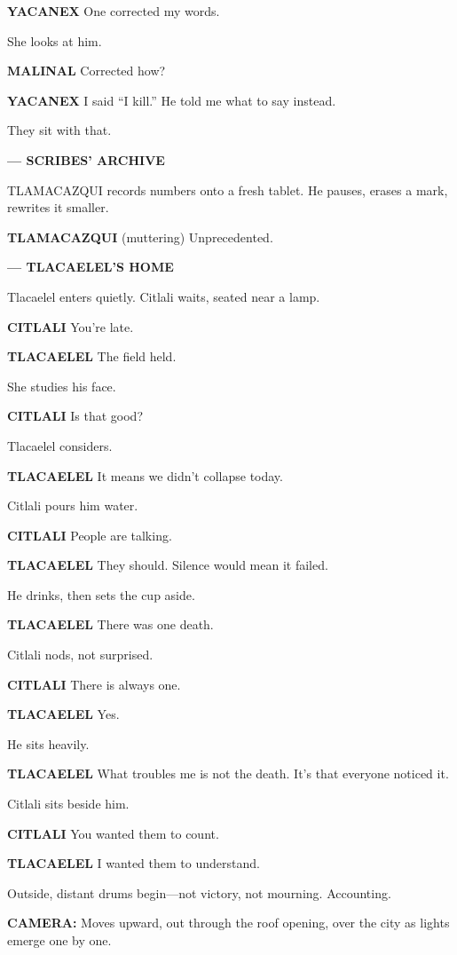 \documentclass[12pt]{article}
\begin{document}
\textbf{YACANEX}  
One corrected my words.

She looks at him.

\textbf{MALINAL}  
Corrected how?

\textbf{YACANEX}  
I said “I kill.”  
He told me what to say instead.

They sit with that.

\textbf{— SCRIBES’ ARCHIVE}

TLAMACAZQUI records numbers onto a fresh tablet. He pauses, erases a mark, rewrites it smaller.

\textbf{TLAMACAZQUI}  
(muttering)  
Unprecedented.

\textbf{— TLACAELEL’S HOME}

Tlacaelel enters quietly. Citlali waits, seated near a lamp.

\textbf{CITLALI}  
You’re late.

\textbf{TLACAELEL}  
The field held.

She studies his face.

\textbf{CITLALI}  
Is that good?

Tlacaelel considers.

\textbf{TLACAELEL}  
It means we didn’t collapse today.

Citlali pours him water.

\textbf{CITLALI}  
People are talking.

\textbf{TLACAELEL}  
They should.  
Silence would mean it failed.

He drinks, then sets the cup aside.

\textbf{TLACAELEL}  
There was one death.

Citlali nods, not surprised.

\textbf{CITLALI}  
There is always one.

\textbf{TLACAELEL}  
Yes.

He sits heavily.

\textbf{TLACAELEL}  
What troubles me is not the death.  
It’s that everyone noticed it.

Citlali sits beside him.

\textbf{CITLALI}  
You wanted them to count.

\textbf{TLACAELEL}  
I wanted them to understand.

Outside, distant drums begin—not victory, not mourning. Accounting.

\textbf{CAMERA:} Moves upward, out through the roof opening, over the city as lights emerge one by one.
\end{document}

